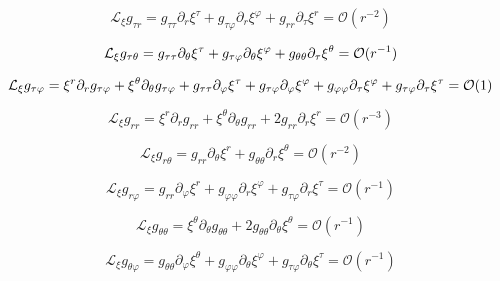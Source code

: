 \begin{equation}
\mathcal{L}_\xi g_{\tau r}=g_{\tau\tau}\partial_{r}\xi^\tau+g_{\tau\varphi}\partial_{r}\xi^\varphi+g_{rr}\partial_{\tau}\xi^r =\mathcal{O}(r^{-2})
\end{equation}

\begin{equation}
\mathcal{L}_\xi g_{\tau\theta}=g_{\tau\tau}\partial_{\theta}\xi^\tau+g_{\tau\varphi}\partial_{\theta}\xi^\varphi+g_{\theta\theta}\partial_{\tau}\xi^\theta=\mathcal{O}(r^{-1})\\
\end{equation}

\begin{equation}
\mathcal{L}_\xi g_{\tau\varphi}=\xi^r\partial_{r}g_{\tau\varphi}+\xi^\theta\partial_{\theta}g_{\tau\varphi}+g_{\tau\tau}\partial_{\varphi}\xi^\tau+g_{\tau\varphi}\partial_{\varphi}\xi^\varphi+g_{\varphi\varphi}\partial_{\tau}\xi^\varphi+g_{\tau\varphi}\partial_{\tau}\xi^\tau=\mathcal{O}(1)\\
\end{equation}

\begin{equation}
\mathcal{L}_\xi g_{rr}=\xi^r\partial_{r}g_{rr}+\xi^\theta\partial_{\theta}g_{rr}+2g_{rr}\partial_{r}\xi^r=\mathcal{O}(r^{-3})
\end{equation}

\begin{equation}
\mathcal{L}_\xi g_{r\theta}=g_{rr}\partial_{\theta}\xi^r+g_{\theta\theta}\partial_{r}\xi^\theta=\mathcal{O}(r^{-2})
\end{equation}

\begin{equation}
\mathcal{L}_\xi g_{r\varphi}=g_{rr}\partial_{\varphi}\xi^r+g_{\varphi\varphi}\partial_{r}\xi^\varphi+g_{\tau\varphi}\partial_{r}\xi^\tau=\mathcal{O}(r^{-1})
\end{equation}

\begin{equation}
\mathcal{L}_\xi g_{\theta\theta}=\xi^\theta\partial_{\theta}g_{\theta\theta}+2g_{\theta\theta}\partial_{\theta}\xi^\theta=\mathcal{O}(r^{-1})
\end{equation}

\begin{equation}
\mathcal{L}_\xi g_{\theta\varphi}=g_{\theta\theta}\partial_{\varphi}\xi^\theta+g_{\varphi\varphi}\partial_{\theta}\xi^\varphi+g_{\tau\varphi}\partial_{\theta}\xi^\tau=\mathcal{O}(r^{-1})
\end{equation}

